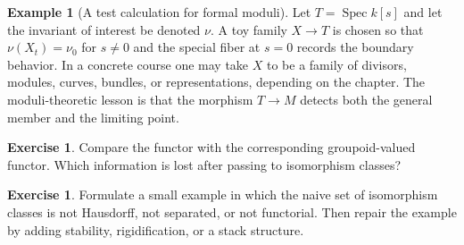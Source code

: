 \documentclass[11pt]{amsart}
\theoremstyle{definition}
\newtheorem{example}[theorem]{Example}
\newtheorem{exercise}[theorem]{Exercise}
\newcommand{\Spec}{\operatorname{Spec}}
\begin{document}
\begin{example}[A test calculation for formal moduli]
Let $T=\Spec k[s]$ and let the invariant of interest be denoted $\nu$.  A toy family $X\to T$ is chosen so that $\nu(X_t)=\nu_0$ for $s\ne0$ and the special fiber at $s=0$ records the boundary behavior.  In a concrete course one may take $X$ to be a family of divisors, modules, curves, bundles, or representations, depending on the chapter.  The moduli-theoretic lesson is that the morphism $T\to M$ detects both the general member and the limiting point.
\end{example}
\begin{exercise}
Compare the functor with the corresponding groupoid-valued functor.  Which information is lost after passing to isomorphism classes?
\end{exercise}
\begin{exercise}
Formulate a small example in which the naive set of isomorphism classes is not Hausdorff, not separated, or not functorial.  Then repair the example by adding stability, rigidification, or a stack structure.
\end{exercise}
\clearpage
\end{document}
